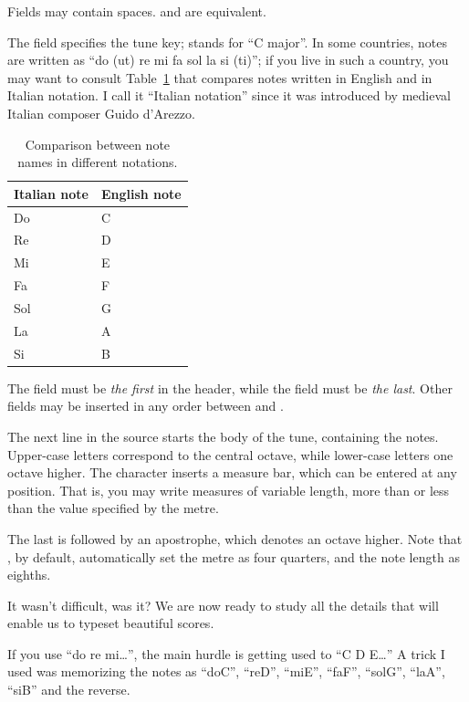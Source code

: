 \documentclass[a4paper,fullpage,12pt]{book}
\begin{document}
Fields may contain spaces.  and  are
equivalent.

The  field specifies the tune key;  stands for ``C
major''. In some countries, notes are written as ``do (ut) re mi fa
sol la si (ti)''; if you live in such a country, you may want to
consult Table~\ref{tab:note} that compares notes written in English
and in Italian notation. I call it ``Italian notation'' since it was
introduced by medieval Italian composer Guido d'Arezzo.

\begin{table}[h]
\begin{center}
\begin{tabular}{ll}
\toprule %
\textbf{Italian note} & \textbf{English note} \\
\midrule %
Do & C \\
Re & D \\
Mi & E \\
Fa & F \\
Sol & G\\
La & A \\
Si & B\\
\bottomrule %
\end{tabular}
\caption{Comparison between note names in different notations.}
\label{tab:note}
\end{center}
\end{table}

The  field must be \emph{the first} in the header, while the
 field must be \emph{the last}. Other fields may be inserted
in any order between  and .

The next line in the source starts the body of the tune, containing
the notes. Upper-case letters correspond to the central octave, while
lower-case letters one octave higher. The \car{\textbar} character
inserts a measure bar, which can be entered at any position. That is,
you may write measures of variable length, more than or less than the
value specified by the metre.

The last  is followed by an apostrophe, which denotes an octave
higher. Note that \abcm{}, by default, automatically set the metre as
four quarters, and the note length as eighths.

It wasn't difficult, was it? We are now ready to study all the details
that will enable us to typeset beautiful scores.

\begin{note}

  If you use ``do re mi{\ldots}'', the main hurdle is getting used to
  ``C D E{\ldots}'' A trick I used was memorizing the notes as
  ``doC'', ``reD'', ``miE'', ``faF'', ``solG'', ``laA'', ``siB'' and
  the reverse.
  
\end{note}
\end{document}
